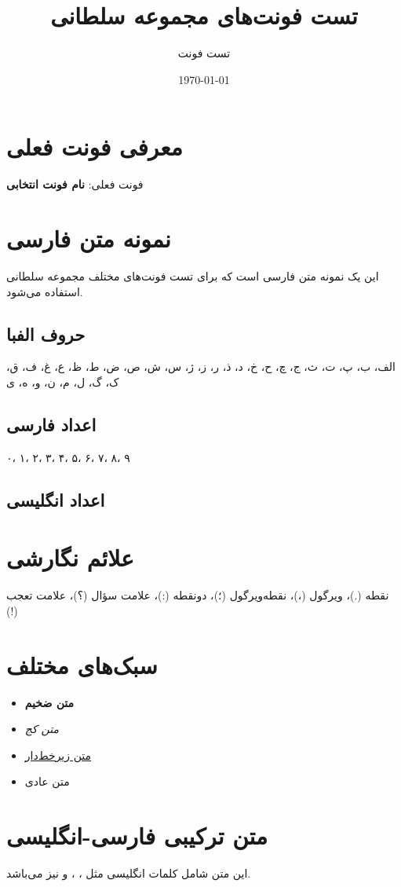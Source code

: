 \documentclass[12pt,a4paper]{article}
\title{تست فونت‌های مجموعه سلطانی}
\author{تست فونت}
\date{\today}
\begin{document}
\maketitle

\section{معرفی فونت فعلی}
فونت فعلی: \textbf{نام فونت انتخابی}

\section{نمونه متن فارسی}
این یک نمونه متن فارسی است که برای تست فونت‌های مختلف مجموعه سلطانی استفاده می‌شود. 

\subsection{حروف الفبا}
الف، ب، پ، ت، ث، ج، چ، ح، خ، د، ذ، ر، ز، ژ، س، ش، ص، ض، ط، ظ، ع، غ، ف، ق، ک، گ، ل، م، ن، و، ه، ی

\subsection{اعداد فارسی}
۰، ۱، ۲، ۳، ۴، ۵، ۶، ۷، ۸، ۹

\subsection{اعداد انگلیسی}

\section{علائم نگارشی}
نقطه (.)، ویرگول (،)، نقطه‌ویرگول (؛)، دونقطه (:)، علامت سؤال (؟)، علامت تعجب (!)

\section{سبک‌های مختلف}
\begin{itemize}
\item \textbf{متن ضخیم}
\item \textit{متن کج} 
\item \underline{متن زیرخط‌دار}
\item متن عادی
\end{itemize}

\section{متن ترکیبی فارسی-انگلیسی}
این متن شامل کلمات انگلیسی مثل ، ،  و  نیز می‌باشد.
\end{document}
